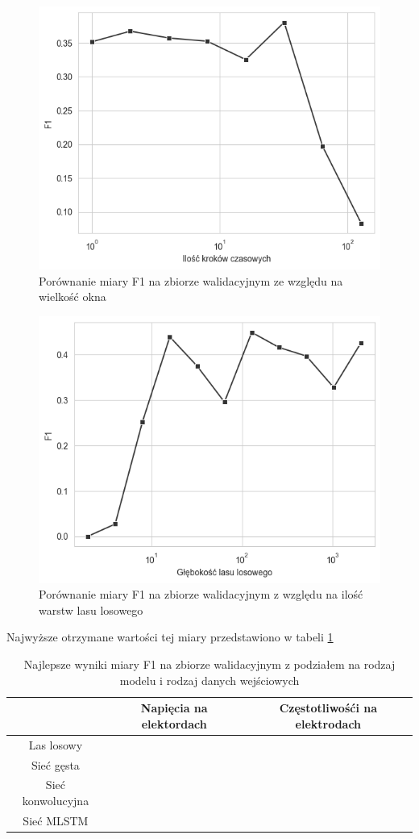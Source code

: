 \documentclass{./assets/wfis}
\begin{document}
\begin{figure}[h!]
    \centering
    \includegraphics[width=0.5\columnwidth]{thesis/assets/window_size_vs_f1.png}
    \caption{Porównanie miary F1 na zbiorze walidacyjnym ze względu na wielkość okna}
    \label{fig:window-size}
\end{figure}

\begin{figure}[h!]
    \centering
    \includegraphics[width=0.5\columnwidth]{thesis/assets/forest_depth_vs_f1.png}
    \caption{Porównanie miary F1 na zbiorze walidacyjnym z względu na ilość warstw lasu losowego}
    \label{fig:rf-num-nodes}
\end{figure}

 Najwyższe otrzymane wartości tej miary przedstawiono w tabeli \ref{tab:high-level-results}


\begin{table}[h]
    \centering
    \begin{tabular}{|c|c|c|}
        \hline
                 & Napięcia na elektordach & Częstotliwośći na elektrodach  \\
        \hline
        Las losowy &  &  \\
        Sieć gęsta &  & \\
        Sieć konwolucyjna & & \\
        Sieć MLSTM & & \\
        \hline
    \end{tabular}
    \caption{Najlepsze wyniki miary F1 na zbiorze walidacyjnym z podziałem na rodzaj modelu i rodzaj danych wejściowych}
    \label{tab:high-level-results}
\end{table}
\end{document}
